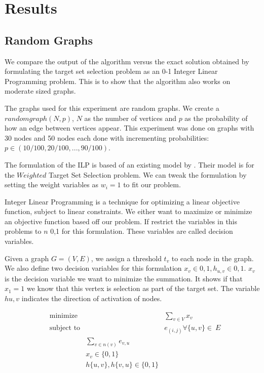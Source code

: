 \clearpage
\section{Results}
\subsection{Random Graphs}

We compare the output of the algorithm versus the exact solution obtained by formulating the target set selection problem as an 0-1 Integer Linear Programming problem. This is to show that the algorithm also works on moderate sized graphs. 

The graphs used for this experiment are random graphs. We create a $random graph (N,p)$, $N$ as the number of vertices and $p$ as the probability of how an edge between vertices appear. This experiment was done on graphs with 30 nodes and 50 nodes each done with incrementing probabilities: $p\in(10/100,20/100,...,90/100)$.

The formulation of the ILP is based of an existing model by \cite{}. Their model is for the $Weighted$ Target Set Selection problem. We can tweak the formulation by setting the weight variables as $w_{i}=1$ to fit our problem.

Integer Linear Programming is a technique for optimizing a linear objective function, subject to linear constraints. We either want to maximize or minimize an objective function based off our problem. If restrict the variables in this problems to $n$ {0,1} for this formulation. These variables are called decision variables.

Given a graph $G=(V,E)$, we assign a threshold $t_{v}$ to each node in the graph. We also define two decision variables for this formulation $x_{v}\in{0,1}, h_{u,v}\in{0,1}$. $x_{v}$ is the decision variable we want to minimize the summation. It shows if that $x_{1}=1$ we know that this vertex is selection as part of the target set. The variable $h{u,v}$ indicates the direction of activation of nodes.

\begin{equation*}
	\begin{aligned}
	& {\text{minimize}}
	& &\sum_{v\in V}{x_{v}}\\ 
	& \text{subject to} 
	& &e_{(i,j)} \forall\{u,v\}\in\ E \\
	& &\sum_{v\in n(v)} e_{v,u} \\
	& &x_{v} \in \{0,1\} \\
	& & h\{u,v\}, h\{v,u\} \in \{0,1\} \\
	\end{aligned}
\end{equation*}

